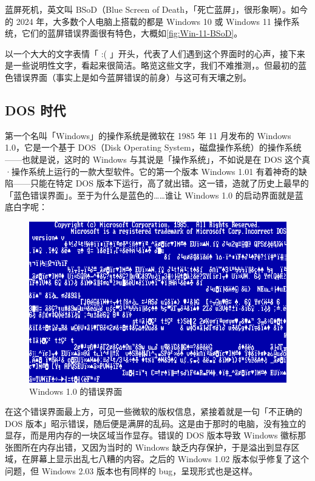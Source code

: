 蓝屏死机，英文叫 BSoD（Blue Screen of Death，「死亡蓝屏」，很形象啊）。如今的 2024 年，大多数个人电脑上搭载的都是 Windows 10 或 Windows 11 操作系统，它们的蓝屏错误界面很有特色，大概如\autoref{fig:Win-11-BSoD}。

以一个大大的文字表情「 :( 」开头，代表了人们遇到这个界面时的心声，接下来是一些说明性文字，看起来很简洁。略览这些文字，我们不难推测，。但最初的蓝色错误界面（事实上是如今蓝屏错误的前身）与这可有天壤之别。

\subsection{DOS 时代}

第一个名叫「Windows」的操作系统是微软在 1985 年 11 月发布的 Windows 1.0，它是一个基于 DOS（Disk Operating System，磁盘操作系统）的操作系统——也就是说，这时的 Windows 与其说是「操作系统」，不如说是在 DOS 这个真·操作系统上运行的一款大型软件。它的第一个版本 Windows 1.01 有着神奇的缺陷——只能在特定 DOS 版本下运行，高了就出错。这一错，造就了历史上最早的「蓝色错误界面」。至于为什么是蓝色的……谁让 Windows 1.0 的启动界面就是蓝底白字呢：

\begin{figure}[htb!]
  \centering
  \includegraphics[width=.65\textwidth]{assets/advanced/Win-1.0-Error.png}
  \caption{Windows 1.0 的错误界面}
  \label{fig:Win-1.0-Error}
\end{figure}

在这个错误界面最上方，可见一些微软的版权信息，紧接着就是一句「不正确的 DOS 版本」昭示错误，随后便是满屏的乱码。这是由于那时的电脑，没有独立的显存，而是用内存的一块区域当作显存。错误的 DOS 版本导致 Windows 徽标那张图所在内存出错，又因为当时的 Windows 缺乏内存保护，于是溢出到显存区域，在屏幕上显示出乱七八糟的内容。之后的 Windows 1.02 版本似乎修复了这个问题，但 Windows 2.03 版本也有同样的 bug，呈现形式也是这样。

